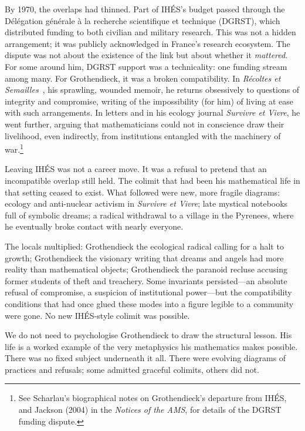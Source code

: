 \documentclass[12pt,a4paper]{article}
\begin{document}
By 1970, the overlaps had thinned. Part of IH\'ES's budget passed through the D\'el\'egation g\'en\'erale \`a la recherche scientifique et technique (DGRST), which distributed funding to both civilian and military research. This was not a hidden arrangement; it was publicly acknowledged in France's research ecosystem. The dispute was not about the existence of the link but about whether it \emph{mattered}. For some around him, DGRST support was a technicality: one funding stream among many. For Grothendieck, it was a broken compatibility. In \emph{R\'ecoltes et Semailles}~\cite{grothendieck_res}, his sprawling, wounded memoir, he returns obsessively to questions of integrity and compromise, writing of the impossibility (for him) of living at ease with such arrangements. In letters and in his ecology journal \emph{Survivre et Vivre}, he went further, arguing that mathematicians could not in conscience draw their livelihood, even indirectly, from institutions entangled with the machinery of war.\footnote{See Scharlau's biographical notes on Grothendieck's departure from IH\'ES, and Jackson (2004) in the \emph{Notices of the AMS}, for details of the DGRST funding dispute.}

Leaving IH\'ES was not a career move. It was a refusal to pretend that an incompatible overlap still held. The colimit that had been his mathematical life in that setting ceased to exist. What followed were new, more fragile diagrams: ecology and anti-nuclear activism in \emph{Survivre et Vivre}; late mystical notebooks full of symbolic dreams; a radical withdrawal to a village in the Pyrenees, where he eventually broke contact with nearly everyone.

The locals multiplied: Grothendieck the ecological radical calling for a halt to growth; Grothendieck the visionary writing that dreams and angels had more reality than mathematical objects; Grothendieck the paranoid recluse accusing former students of theft and treachery. Some invariants persisted---an absolute refusal of compromise, a suspicion of institutional power---but the compatibility conditions that had once glued these modes into a figure legible to a community were gone. No new IH\'ES-style colimit was possible.

We do not need to psychologise Grothendieck to draw the structural lesson. His life is a worked example of the very metaphysics his mathematics makes possible. There was no fixed subject underneath it all. There were evolving diagrams of practices and refusals; some admitted graceful colimits, others did not.
\end{document}
